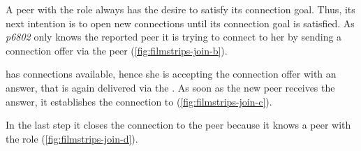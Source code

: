 A peer with the role \peer always has the desire to satisfy its connection goal.
Thus, its next intention is to open new  connections until its connection goal is satisfied. As \textit{p6802} only knows the reported peer \alice it is trying to connect to her by sending a connection offer via the \signal peer (\vref{fig:filmstrips-join-b}).

\alice has connections available, hence she is accepting the connection offer with an answer, that is again delivered via the \signal. As soon as the new peer receives the answer, it establishes the connection to \alice (\vref{fig:filmstrips-join-c}).

In the last step it closes the connection to the \signal peer because it knows a peer with the role \router (\vref{fig:filmstrips-join-d}).

